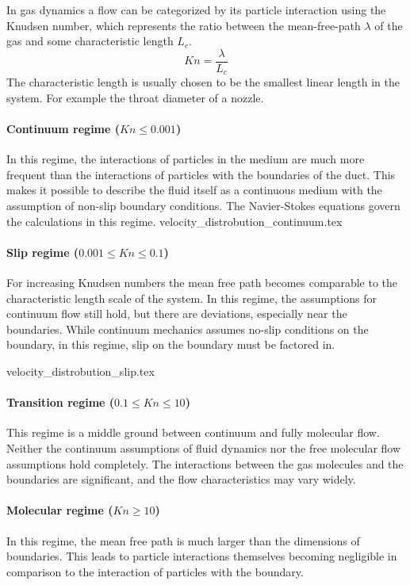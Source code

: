 	In gas dynamics a flow can be categorized by its particle interaction using the Knudsen number, which represents the ratio between the mean-free-path $\lambda$ of the gas and some characteristic length $L_c$.
	$$
		Kn=\frac{\lambda}{L_c}
	$$
	The characteristic length is usually chosen to be the smallest linear length in the system.
	For example the throat diameter of a nozzle. \cite{putignano2012supersonic}
\paragraph{Continuum regime (\(Kn \leq 0.001\))}
	
	In this regime, the interactions of particles in the medium are much more frequent than the interactions of particles with the boundaries of the duct.
	This makes it possible to describe the fluid itself as a continuous medium with the assumption of non-slip boundary conditions.
	The Navier-Stokes equations govern the calculations in this regime.
	{velocity_distrobution_continuum.tex}

\paragraph{Slip regime (\(0.001 \leq Kn \leq 0.1\))}

	For increasing Knudsen numbers the mean free path becomes comparable to the characteristic length scale of the system.
	In this regime, the assumptions for continuum flow still hold, but there are deviations, especially near the boundaries.
	While continuum mechanics assumes no-slip conditions on the boundary, in this regime, slip on the boundary must be factored in.

	{velocity_distrobution_slip.tex}
	\newpage

\paragraph{Transition regime (\(0.1 \leq Kn \leq 10\))}
	
	This regime is a middle ground between continuum and fully molecular flow.
	Neither the continuum assumptions of fluid dynamics nor the free molecular flow assumptions hold completely.
	The interactions between the gas molecules and the boundaries are significant, and the flow characteristics may vary widely.

\paragraph{Molecular regime (\(Kn \geq 10\))}

	In this regime, the mean free path is much larger than the dimensions of boundaries.
	This leads to particle interactions themselves becoming negligible in comparison to the interaction of particles with the boundary.
	\cite{rapp2017microfluidics}
